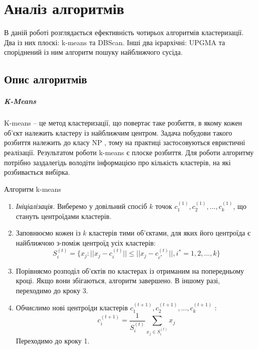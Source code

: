 \chapter {Аналіз алгоритмів}

    В даній роботі розглядається ефективність чотирьох алгоритмів кластеризації. Два із них плоскі: k-means та DBScan. Інші два ієрархічні: UPGMA та споріднений із ним алгоритм пошуку найближчого сусіда.

\section {Опис алгоритмів}
    \paragraph {K-Means}
        K-means -- це метод кластеризації, що повертає таке розбиття, в якому кожен об'єкт належить кластеру із найближчим центром. Задача побудови такого розбиття належить до класу NP \cite{KmeansNpHard}, тому на практиці застосовуються евристичні реалізації.
        Результатом роботи k-means є плоске розбиття. Для роботи алгоритму потрібно заздалегідь володіти інформацією про кількість кластерів, на які розбивається вибірка.
        \begin{algorithm}
            \caption {Алгоритм k-means}
            \begin{enumerate}
                \item[ ] \emph {Ініціалізація.}
                    Виберемо у довільний спосіб $k$ точок $c_1^{(1)}, c_2^{(1)}, ..., c_k^{(1)}$, що стануть центроїдами кластерів.
                \item
                    Заповнюємо кожен із $k$ кластерів тими об'єктами, для яких його центроїда є найближчою з-поміж центроїд усіх кластерів:
                    \[
                        S_i^{(t)} = \{x_j : ||x_j - c_i^{(t)}|| \leq ||x_j - c_{c^*}^{(t)}||, 
                        i^* = 1, 2, ..., k\}
                    \]
                \item
                    Порівняємо розподіл об'єктів по кластерах із отриманим на попередньому кроці.
                    Якщо вони збігаються, алгоритм завершено. В іншому разі, переходимо до кроку 3.
                \item
                    Обчислимо нові центроїди кластерів $c_1^{(t+1)}, c_2^{(t+1)}, ..., c_k^{(t+1)}$ :
                    \[
                        c_i^{(t+1)} = \frac{1} {S_i^{(t)}} \sum_{x_j \in S_i^{(t)}} x_j
                    \]
                    Переходимо до кроку 1.                        
            \end{enumerate}
        \end{algorithm}
        
